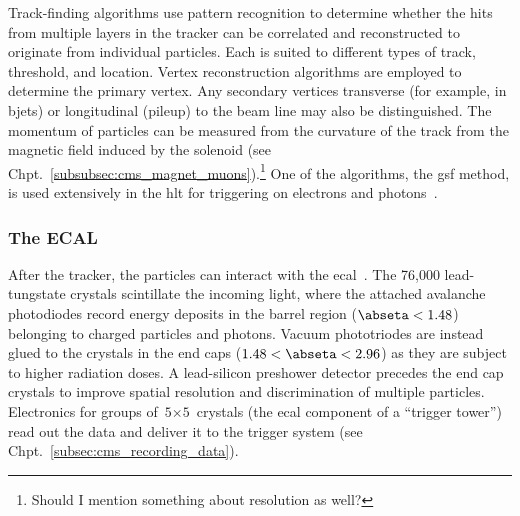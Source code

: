 
Track-finding algorithms use pattern recognition to determine whether the hits from multiple layers in the tracker can be correlated and reconstructed to originate from individual particles. Each is suited to different types of track, \pt threshold, and location. Vertex reconstruction algorithms are employed to determine the primary vertex. Any secondary vertices transverse (for example, in \glspl{bjet}) or longitudinal (\gls{pileup}) to the beam line may also be distinguished. The momentum of particles can be measured from the curvature of the track from the magnetic field induced by the solenoid (see Chpt.~\ref{subsubsec:cms_magnet_muons}).\footnote{Should I mention something about resolution as well?} One of the algorithms, the \acrfull{gsf} method, is used extensively in the \acrshort{hlt} for triggering on electrons and photons~\cite{Anuar_2015}.





\subsubsection{The ECAL}
\label{subsubsec:cms_ecal}

After the tracker, the particles can interact with the \acrshort{ecal}~\cite{CERN-LHCC-97-033,Bloch:581342}. The 76,000 lead-tungstate crystals scintillate the incoming light, where the attached avalanche photodiodes record energy deposits in the barrel region ($\abseta < \text{1.48}$) belonging to charged particles and photons. Vacuum phototriodes are instead glued to the crystals in the end caps ($\text{1.48} < \abseta < \text{2.96}$) as they are subject to higher radiation doses. A lead-silicon preshower detector precedes the end cap crystals to improve spatial resolution and discrimination of multiple particles. Electronics for groups of $\text{5}\times\text{5}$ crystals (the \acrshort{ecal} component of a ``trigger tower'') read out the data and deliver it to the trigger system (see Chpt.~\ref{subsec:cms_recording_data}).

